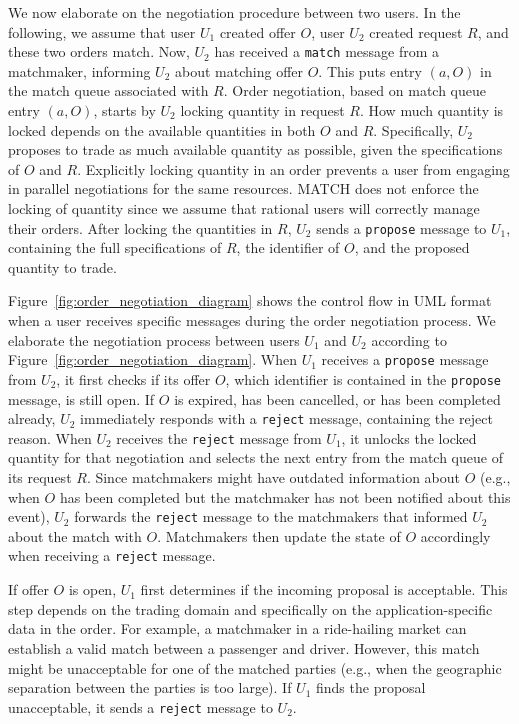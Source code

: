 We now elaborate on the negotiation procedure between two users.
In the following, we assume that user $ U_1 $ created offer $ O $, user $ U_2 $ created request $ R $, and these two orders match.
Now, $ U_2 $ has received a \texttt{match} message from a matchmaker, informing $ U_2 $ about matching offer $ O $.
This puts entry $ (a, O) $ in the match queue associated with $ R $.
Order negotiation, based on match queue entry $ (a, O) $, starts by $ U_2 $ locking quantity in request $ R $.
How much quantity is locked depends on the available quantities in both $ O $ and $ R $.
Specifically, $ U_2 $ proposes to trade as much available quantity as possible, given the specifications of $ O $ and $ R $.
Explicitly locking quantity in an order prevents a user from engaging in parallel negotiations for the same resources.
MATCH does not enforce the locking of quantity since we assume that rational users will correctly manage their orders.
After locking the quantities in $ R $, $ U_2 $ sends a \texttt{propose} message to $ U_1 $, containing the full specifications of $ R $, the identifier of $ O $, and the proposed quantity to trade.

Figure~\ref{fig:order_negotiation_diagram} shows the control flow in UML format when a user receives specific messages during the order negotiation process.
We elaborate the negotiation process between users $ U_1 $ and $ U_2 $ according to Figure~\ref{fig:order_negotiation_diagram}.
When $ U_1 $ receives a \texttt{propose} message from $ U_2 $, it first checks if its offer $ O $, which identifier is contained in the \texttt{propose} message, is still open.
If $ O $ is expired, has been cancelled, or has been completed already, $ U_2 $ immediately responds with a \texttt{reject} message, containing the reject reason.
When $ U_2 $ receives the \texttt{reject} message from $ U_1 $, it unlocks the locked quantity for that negotiation and selects the next entry from the match queue of its request $ R $.
Since matchmakers might have outdated information about $ O $ (e.g., when $ O $ has been completed but the matchmaker has not been notified about this event), $ U_2 $ forwards the \texttt{reject} message to the matchmakers that informed $ U_2 $ about the match with $ O $.
Matchmakers then update the state of $ O $ accordingly when receiving a \texttt{reject} message.

If offer $ O $ is open, $ U_1 $ first determines if the incoming proposal is acceptable.
This step depends on the trading domain and specifically on the application-specific data in the order.
For example, a matchmaker in a ride-hailing market can establish a valid match between a passenger and driver.
However, this match might be unacceptable for one of the matched parties (e.g., when the geographic separation between the parties is too large).
If $ U_1 $ finds the proposal unacceptable, it sends a \texttt{reject} message to $ U_2 $.

